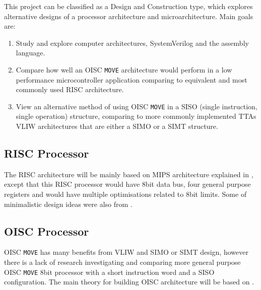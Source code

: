 \iffalse
This chapter describes your Goals and Objectives. 
Indicate how your work is intended to expand on previous historical work.
Present your motivations; why are you doing this?
Indicate the type of project you have(see the list above).

Types of Projects:
2) Design and Construction projects:
These types of projects involve the design and construction of some 
electrical or electronic apparatus or device within the bounds 
of the department's educational mandate.
\fi


This project can be classified as a Design and Construction type, which explores alternative designs of a processor architecture and microarchitecture. Main goals are:
\begin{enumerate}
	\item Study and explore computer architectures, SystemVerilog and the assembly language. 
	\item Compare how well an OISC \texttt{MOVE} architecture would perform in a low performance microcontroller application comparing to equivalent and most commonly used RISC architecture.
	\item View an alternative method of using OISC \texttt{MOVE} in a SISO (single instruction, single operation) structure, comparing to more commonly implemented TTAs VLIW architectures that are either a SIMO or a SIMT structure.
\end{enumerate}



\subsection{RISC Processor}
The RISC architecture will be mainly based on MIPS architecture explained in \autocite{harris_harris_2013}, except that this RISC processor would have 8bit data bus, four general purpose registers and would have multiple optimisations related to 8bit limits. Some of minimalistic design ideas were also from \autocite{gilreath_laplante_2003}.


\subsection{OISC Processor}
OISC \texttt{MOVE} has many benefits from VLIW and SIMO or SIMT design, however there is a lack of research investigating and comparing more general purpose OISC \texttt{MOVE} 8bit processor with a short instruction word and a SISO configuration. The main theory for building OISC architecture will be based on \autocite{gilreath_laplante_2003}.

